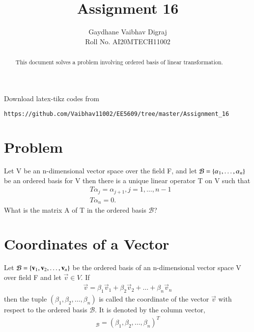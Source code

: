 \documentclass[journal,12pt,twocolumn]{IEEEtran}
\begin{document}
     \def\rightbox#1{\makebox[0in][r]{#1}}
     \def\centbox#1{\makebox[0in]{#1}}
     \def\topbox#1{\raisebox{-\baselineskip}[0in][0in]{#1}}
     \def\midbox#1{\raisebox{-0.5\baselineskip}[0in][0in]{#1}}
\vspace{3cm}
\title{Assignment 16}
\author{Gaydhane Vaibhav Digraj \\ Roll No. AI20MTECH11002}
\maketitle
\newpage
\bigskip
\renewcommand{\thefigure}{\theenumi}
\renewcommand{\thetable}{\theenumi}
\begin{abstract}
This document solves a problem involving ordered basis of linear transformation.
\end{abstract}
%
Download latex-tikz codes from 
%
\begin{lstlisting}
https://github.com/Vaibhav11002/EE5609/tree/master/Assignment_16
\end{lstlisting}
%
\section{Problem}
Let V be an n-dimensional vector space over the field F, and let $\mathcal{B} = \left\{\alpha_1,\ldots, \alpha_n\right\}$ be an ordered basis for V then there is a unique linear operator T on V such that 
\begin{align*}
   &T\alpha_{j} = \alpha_{j+1},  j=1,\ldots,n-1 \\
   &T\alpha_n = 0. 
\end{align*}
What is the matrix A of T in the ordered basis $\mathcal{B}$?

\section{Coordinates of a Vector}
Let $\mathcal{B} = \left\{\mathbf{v}_1, \mathbf{v}_2,\ldots,\mathbf{v}_n\right\}$ be the ordered basis of an n-dimensional vector space V over field F and let $\vec{v}\in V$. If
\begin{align}
    \vec{v} = \beta_{1}\vec{v}_1 + \beta_{2}\vec{v}_2 + \ldots + \beta_{n}\vec{v}_n \label{v}
\end{align}
then the tuple $(\beta_{1},\beta_{2},\ldots,\beta_{n})$ is called the coordinate of the vector $\vec{v}$ with respect to the ordered basis $\mathcal{B}$. 
It is denoted by the column vector,
\begin{align}
    [\vec{v}]_\mathcal{B} = (\beta_{1},\beta_{2},\ldots,\beta_{n})^{T} \label{v_col}
\end{align}
\end{document}
